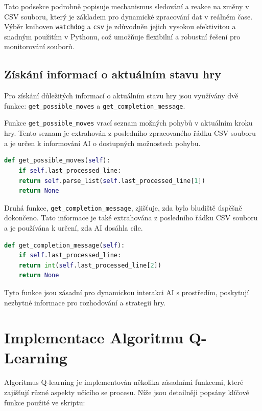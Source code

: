 \documentclass[12pt, a4paper,
twoside,        %
openright
]{report}
\begin{document}
Tato podsekce podrobně popisuje mechanismus sledování a reakce na změny v CSV souboru, který je základem pro dynamické zpracování dat v reálném čase. Výběr knihoven \texttt{watchdog} a \texttt{csv} je zdůvodněn jejich vysokou efektivitou a snadným použitím v Pythonu, což umožňuje flexibilní a robustní řešení pro monitorování souborů.

\subsection{Získání informací o aktuálním stavu hry}
Pro získání důležitých informací o aktuálním stavu hry jsou využívány dvě funkce: \texttt{get\_possible\_moves} a \texttt{get\_completion\_message}.

Funkce \texttt{get\_possible\_moves} vrací seznam možných pohybů v aktuálním kroku hry. Tento seznam je extrahován z posledního zpracovaného řádku CSV souboru a je určen k informování AI o dostupných možnostech pohybu.

\begin{lstlisting}[language=Python, caption={Získání seznamu možných pohybů}]
	def get_possible_moves(self):
	if self.last_processed_line:
	return self.parse_list(self.last_processed_line[1])
	return None
\end{lstlisting}
\newpage
Druhá funkce, \texttt{get\_completion\_message}, zjišťuje, zda bylo bludiště úspěšně dokončeno. Tato informace je také extrahována z posledního řádku CSV souboru a je používána k určení, zda AI dosáhla cíle.

\begin{lstlisting}[language=Python, caption={Zjištění dokončení bludiště}]
	def get_completion_message(self):
	if self.last_processed_line:
	return int(self.last_processed_line[2])
	return None
\end{lstlisting}

Tyto funkce jsou zásadní pro dynamickou interakci AI s prostředím, poskytují nezbytné informace pro rozhodování a strategii hry.



\section{Implementace Algoritmu Q-Learning}

Algoritmus Q-learning je implementován několika zásadními funkcemi, které zajišťují různé aspekty učícího se procesu. Níže jsou detailněji popsány klíčové funkce použité ve skriptu:
\end{document}
